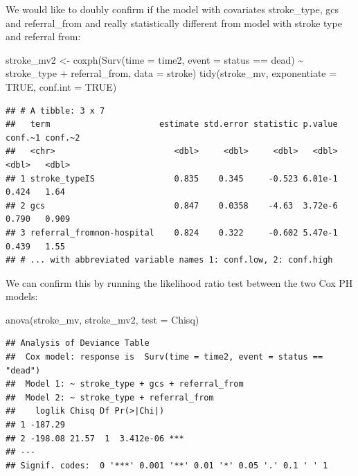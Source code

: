 \documentclass[
  10pt,
]{krantz}
\newenvironment{Shaded}{\begin{snugshade}}{\end{snugshade}}
\newcommand{\AttributeTok}[1]{\textcolor[rgb]{0.77,0.63,0.00}{#1}}
\newcommand{\ConstantTok}[1]{\textcolor[rgb]{0.00,0.00,0.00}{#1}}
\newcommand{\FunctionTok}[1]{\textcolor[rgb]{0.00,0.00,0.00}{#1}}
\newcommand{\NormalTok}[1]{#1}
\newcommand{\OtherTok}[1]{\textcolor[rgb]{0.56,0.35,0.01}{#1}}
\newcommand{\SpecialCharTok}[1]{\textcolor[rgb]{0.00,0.00,0.00}{#1}}
\newcommand{\StringTok}[1]{\textcolor[rgb]{0.31,0.60,0.02}{#1}}
\begin{document}
We would like to doubly confirm if the model with covariates stroke\_type, gcs and referral\_from and really statistically different from model with stroke type and referral from:

\begin{Shaded}
\begin{Highlighting}[]
\NormalTok{stroke\_mv2 }\OtherTok{\textless{}{-}} 
  \FunctionTok{coxph}\NormalTok{(}\FunctionTok{Surv}\NormalTok{(}\AttributeTok{time =}\NormalTok{ time2, }
             \AttributeTok{event =}\NormalTok{ status }\SpecialCharTok{==} \StringTok{\textquotesingle{}dead\textquotesingle{}}\NormalTok{) }\SpecialCharTok{\textasciitilde{}}\NormalTok{ stroke\_type }\SpecialCharTok{+}\NormalTok{ referral\_from, }
        \AttributeTok{data =}\NormalTok{ stroke)}
\FunctionTok{tidy}\NormalTok{(stroke\_mv, }\AttributeTok{exponentiate =} \ConstantTok{TRUE}\NormalTok{, }\AttributeTok{conf.int =} \ConstantTok{TRUE}\NormalTok{)}
\end{Highlighting}
\end{Shaded}

\begin{verbatim}
## # A tibble: 3 x 7
##   term                      estimate std.error statistic p.value conf.~1 conf.~2
##   <chr>                        <dbl>     <dbl>     <dbl>   <dbl>   <dbl>   <dbl>
## 1 stroke_typeIS                0.835    0.345     -0.523 6.01e-1   0.424   1.64 
## 2 gcs                          0.847    0.0358    -4.63  3.72e-6   0.790   0.909
## 3 referral_fromnon-hospital    0.824    0.322     -0.602 5.47e-1   0.439   1.55 
## # ... with abbreviated variable names 1: conf.low, 2: conf.high
\end{verbatim}

We can confirm this by running the likelihood ratio test between the two Cox PH models:

\begin{Shaded}
\begin{Highlighting}[]
\FunctionTok{anova}\NormalTok{(stroke\_mv, stroke\_mv2, }\AttributeTok{test =} \StringTok{\textquotesingle{}Chisq\textquotesingle{}}\NormalTok{)}
\end{Highlighting}
\end{Shaded}

\begin{verbatim}
## Analysis of Deviance Table
##  Cox model: response is  Surv(time = time2, event = status == "dead")
##  Model 1: ~ stroke_type + gcs + referral_from
##  Model 2: ~ stroke_type + referral_from
##    loglik Chisq Df Pr(>|Chi|)    
## 1 -187.29                        
## 2 -198.08 21.57  1  3.412e-06 ***
## ---
## Signif. codes:  0 '***' 0.001 '**' 0.01 '*' 0.05 '.' 0.1 ' ' 1
\end{verbatim}
\end{document}
